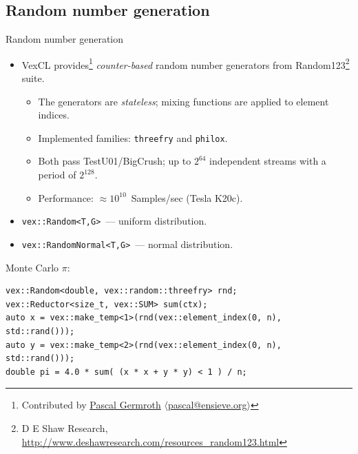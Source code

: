 \documentclass[@BEAMER_OPTIONS@]{beamer}
\newcommand{\code}[1]{\lstinline|#1|}
\begin{document}
\note{ }

\subsection{Random number generation}

\begin{frame}[fragile]{Random number generation}
    \begin{itemize}
        \item VexCL provides\footnote{Contributed by
            \href{https://github.com/neapel}{Pascal Germroth}
            $\langle$\href{mailto:pascal@ensieve.org}{pascal@ensieve.org}$\rangle$}
            \emph{counter-based} random number generators from
            Random123\footnote{D E Shaw Research,
                \href{http://www.deshawresearch.com/resources\_random123.html}{http://www.deshawresearch.com/resources\_random123.html}}
            suite.
            \vspace{-0.5\baselineskip}
            \begin{itemize}
                \item The generators are \emph{stateless}; mixing functions are
                    applied to element indices.
                \item Implemented families: \code{threefry} and \code{philox}.
                \item Both pass TestU01/BigCrush; up to \alert{$2^{64}$}
                    independent streams with a period of \alert{$2^{128}$}.
                \item Performance: \alert{$\approx 10^{10}$}~Samples/sec (Tesla
                    K20c).
            \end{itemize}
        \item \code{vex::Random<T,G>}~--- uniform distribution.
        \item \code{vex::RandomNormal<T,G>}~--- normal distribution.
    \end{itemize}
    \vspace{-0.5\baselineskip}
    \begin{exampleblock}{Monte Carlo $\pi$:}
        \begin{lstlisting}
vex::Random<double, vex::random::threefry> rnd;
vex::Reductor<size_t, vex::SUM> sum(ctx);
auto x = vex::make_temp<1>(rnd(vex::element_index(0, n), std::rand()));
auto y = vex::make_temp<2>(rnd(vex::element_index(0, n), std::rand()));
double pi = 4.0 * sum( (x * x + y * y) < 1 ) / n;
        \end{lstlisting}
    \end{exampleblock}
\end{frame}
\end{document}
